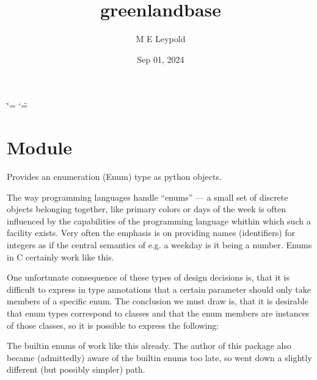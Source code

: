 \documentclass[letterpaper,10pt,english]{sphinxmanual}
\title{greenland\sphinxhyphen{}base}
\date{Sep 01, 2024}
\author{M E Leypold}
\begin{document}
\ifdefined\shorthandoff
  \ifnum\catcode`\=\string=\active\shorthandoff{=}\fi
  \ifnum\catcode`\"=\active{}\fi
\fi

\pagestyle{empty}
\sphinxmaketitle
\pagestyle{plain}
\sphinxtableofcontents
\pagestyle{normal}
\label{\detokenize{index::doc}}


\sphinxstepscope


\chapter{Module }
\label{\detokenize{enums:module-greenland-base-enums}}\label{\detokenize{enums::doc}}\label{\detokenize{enums:module-greenland.base.enums}}
\sphinxAtStartPar
Provides an enumeration (Enum) type as python objects.

\sphinxAtStartPar
The way programming languages handle “enums” — a small set of
discrete objects belonging together, like primary colors or days of
the week \textendash{} is often influenced by the capabilities of the programming
language whithin which such a facility exists. Very often the emphasis
is on providing names (identifiers) for integers as if the central
semantics of e.g. a weekday is it being a number. Enums in C certainly
work like this.

\sphinxAtStartPar
One unfortunate consequence of these types of design decisions is,
that it is difficult to express in type annotations that a certain
parameter should only take members of a specific enum. The conclusion
we must draw is, that it is desirable that enum types correspond to
classes and that the enum members are instances of those classes, so
it is possible to express the following:

\begin{sphinxVerbatim}[commandchars=\\\{\}]
  
\end{sphinxVerbatim}

\sphinxAtStartPar
The built\sphinxhyphen{}in enums of  work like this already.  The author of
this package also became (admittedly) aware of the built\sphinxhyphen{}in enums too
late, so went down a slightly different (but possibly simpler) path.
\end{document}
